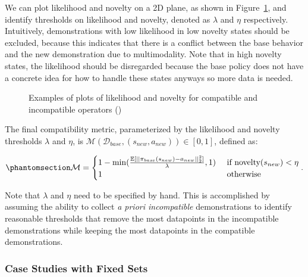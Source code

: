 \documentclass[
  letterpaper,
  numbers=noenddot,
  DIV=11]{scrreprt}
\theoremstyle{definition}
\theoremstyle{plain}
\theoremstyle{plain}
\theoremstyle{remark}
\begin{document}
We can plot likelihood and novelty on a 2D plane, as shown in
Figure~\ref{fig-likelihood_novelty}, and identify thresholds on
likelihood and novelty, denoted as \(\lambda\) and \(\eta\)
respectively. Intuitively, demonstrations with low likelihood in low
novelty states should be excluded, because this indicates that there is
a conflict between the base behavior and the new demonstration due to
multimodality. Note that in high novelty states, the likelihood should
be disregarded because the base policy does not have a concrete idea for
how to handle these states anyways so more data is needed.

\begin{figure}


\caption{\label{fig-likelihood_novelty}Examples of plots of likelihood
and novelty for compatible and incompatible operators
()}

\end{figure}%

The final compatibility metric, parameterized by the likelihood and
novelty thresholds \(\lambda\) and \(\eta\), is
\(\mathcal{M}(\mathcal{D}_{base}, (s_{new}, a_{new})) \in [0, 1]\),
defined as:

\begin{equation}\phantomsection\label{eq-eq3.63}{\begin{aligned}
    \mathcal{M} = \begin{cases} 
        1 - \min(\frac{\mathbb{E}[|| \pi_{base}(s_{new}) - a_{new} ||^2_2]}{\lambda}, 1) & \text{ if } \text{novelty}(s_{new}) < \eta \\
        1 & \text{ otherwise }
       \end{cases}.
\end{aligned}}\end{equation}

Note that \(\lambda\) and \(\eta\) need to be specified by hand. This is
accomplished by assuming the ability to collect \emph{a priori
incompatible} demonstrations to identify reasonable thresholds that
remove the most datapoints in the incompatible demonstrations while
keeping the most datapoints in the compatible demonstrations.

\subsubsection*{Case Studies with Fixed
Sets}\label{case-studies-with-fixed-sets}
\end{document}
